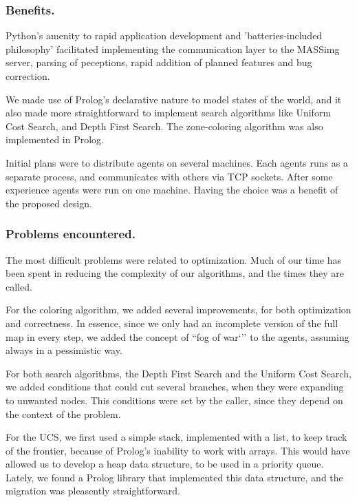 \documentclass{llncs2e/llncs}
\begin{document}
\subsubsection{Benefits.}
    
    Python's amenity to rapid application development and 'batteries-included 
    philosophy' facilitated implementing the communication layer to the MASSimg 
    server, parsing of peceptions, rapid addition of planned features and bug 
    correction.

    We made use of Prolog's declarative nature to model states of the world, and it 
    also made more straightforward to implement search algorithms like Uniform Cost 
    Search, and Depth First Search. The zone-coloring algorithm was also 
    implemented in Prolog.

    Initial plans were to distribute agents on several machines. Each agents runs 
    as a separate process, and communicates with others via TCP sockets. After 
    some experience agents were run on one machine. Having the choice was a 
    benefit of the proposed design.

\subsubsection{Problems encountered.}

    The most difficult problems were related to optimization. Much of our time has 
    been spent in reducing the complexity of our algorithms, and the times they 
    are called.

    For the coloring algorithm, we added several improvements, for both 
    optimization and correctness. In essence, since we only had an incomplete 
    version of the full map in every step, we added the concept of ``fog of war`'' 
    to the agents, assuming always in a pessimistic way. 

    For both search algorithms, the Depth First Search and the Uniform Cost 
    Search, we added conditions that could cut several branches, when they were 
    expanding to unwanted nodes. This conditions were set by the caller, since 
    they depend on the context of the problem.

    For the UCS, we first used a simple stack, implemented with a list, to keep 
    track of the frontier, because of Prolog's inability to work with arrays. This 
    would have allowed us to develop a heap data structure, to be used in a 
    priority queue. Lately, we found a Prolog library that implemented this data 
    structure, and the migration was pleasently straightforward.
\end{document}
